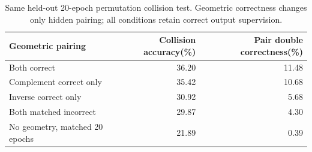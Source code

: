 \begin{table}[ht]\centering
\begin{tabular}{lrr}\toprule
Geometric pairing & Collision accuracy(\%) & Pair double correctness(\%)\\\midrule
Both correct & 36.20 & 11.48\\
Complement correct only & 35.42 & 10.68\\
Inverse correct only & 30.92 & 5.68\\
Both matched incorrect & 29.87 & 4.30\\
No geometry, matched 20 epochs & 21.89 & 0.39\\\bottomrule
\end{tabular}
\caption{Same held-out 20-epoch permutation collision test. Geometric correctness changes only hidden pairing; all conditions retain correct output supervision.}\end{table}
